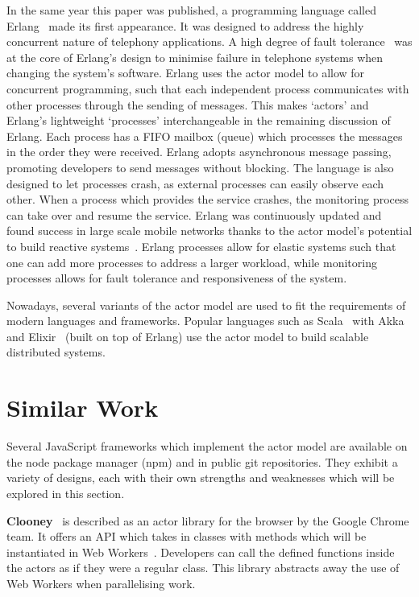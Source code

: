 \documentclass[oneside]{um-fict}
\begin{document}
In the same year this paper was published, a programming language called Erlang~\cite{erlang} made its first appearance. It was designed to address the highly concurrent nature of telephony applications. A high degree of fault tolerance~\cite{faulttolerance} was at the core of Erlang's design to minimise failure in telephone systems when changing the system's software. Erlang uses the actor model to allow for concurrent programming, such that each independent process communicates with other processes through the sending of messages. This makes `actors' and Erlang's lightweight `processes' interchangeable in the remaining discussion of Erlang. Each process has a FIFO mailbox (queue) which processes the messages in the order they were received. Erlang adopts asynchronous message passing, promoting developers to send messages without blocking. The language is also designed to let processes crash, as external processes can easily observe each other. When a process which provides the service crashes, the monitoring process can take over and resume the service. Erlang was continuously updated and found success in large scale mobile networks thanks to the actor model's potential to build reactive systems~\cite{reactivemanifesto}. Erlang processes allow for elastic systems such that one can add more processes to address a larger workload, while monitoring processes allows for fault tolerance and responsiveness of the system. 

Nowadays, several variants of the actor model are used to fit the requirements of modern languages and frameworks. Popular languages such as Scala~\cite{scala} with Akka~\cite{akka} and Elixir~\cite{elixir} (built on top of Erlang) use the actor model to build scalable distributed systems.

\section{Similar Work}
Several JavaScript frameworks which implement the actor model are available on the node package manager (npm) and in public git repositories. They exhibit a variety of designs, each with their own strengths and weaknesses which will be explored in this section.

\textbf{Clooney}~\cite{clooney} is described as an actor library for the browser by the Google Chrome team. It offers an API which takes in classes with methods which will be instantiated in Web Workers~\cite{webworkers}. Developers can call the defined functions inside the actors as if they were a regular class. This library abstracts away the use of Web Workers when parallelising work.
\end{document}
